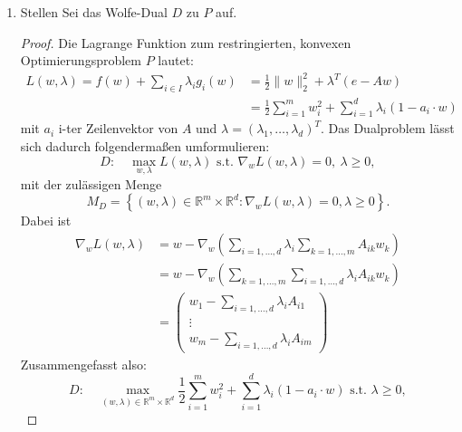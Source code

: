 \documentclass[12pt]{extreport} %
\newcommand{\R}{\mathbb{R}}
\theoremstyle{named}
\theoremstyle{nnamed}
\theoremstyle{itshape}
\theoremstyle{normal}
\begin{document}
\begin{enumerate}
\begin{proof}
			Beim gegebenen Problem ist $g_i(w) = - (A w)_i + 1$ für alle $i \in \{1, \dotsc, d \}$ eine lineare und somit konvexe Funktion. Da $f \in C^2(\R^m)$ mit $f(w) = \frac{1}{2} \sum_{i=1,\dotsc, m} w_i^2$ folgt $\nabla_w f(w) = w$ und 
			$$ D^2 f =  \left(\begin{array}{rrrrr} 1 & 0 & \dotsc & 0 \\ 0 & 1 & 0 & \vdots \\ \vdots & 0 & \ddots & 0\\ 0 &  \dotsc & 0 & 1 \end{array}\right) \succ 0, $$
			womit nach 2.5.10 $f$ insbesondere konvex und $P$ ein konvexes Optimierungsproblem ist.
		\end{proof}
	\item Stellen Sei das Wolfe-Dual $D$ zu $P$ auf.
		\begin{proof}
			Die Lagrange Funktion zum restringierten, konvexen Optimierungsproblem $P$ lautet:
			\begin{align*}
				L(w, \lambda) = f(w) + \sum_{i \in I} \lambda_i g_i(w) & = \frac{1}{2} \| w \|_2^2 + \lambda^T \left( e - Aw \right) \\
					& =\frac{1}{2} \sum_{i=1}^m w_i^2 + \sum_{i=1}^d \lambda_i \left(1 - a_i \cdot w \right)
			\end{align*}
			mit $a_i$ i-ter Zeilenvektor von $A$ und $\lambda = \left( \lambda_1, \dotsc, \lambda_d \right)^T$. Das Dualproblem lässt sich dadurch folgendermaßen umformulieren:
			$$ D: \quad \max_{w,\lambda} L(w, \lambda) \text{ s.t. } \nabla_w L(w, \lambda) = 0, ~\lambda \geq 0, $$
			mit der zulässigen Menge
			$$ M_D = \left\{ (w, \lambda) \in \R^m \times \R^d \colon \nabla_w L(w, \lambda) = 0, \lambda \geq 0 \right\}. $$
			Dabei ist 
			\begin{align*}
			 \nabla_w L(w, \lambda) & = w - \nabla_w \left( \sum_{i=1,\dotsc,d} \lambda_i \sum_{k=1, \dotsc, m} A_{ik}w_{k} \right) \\
			& = w - \nabla_w \left( \sum_{k=1, \dotsc, m}  \sum_{i=1,\dotsc,d}  \lambda_i A_{ik}w_{k} \right) \\
			& = \left(\begin{array}{c} w_1 -\sum_{i=1,\dotsc,d}  \lambda_i A_{i1}  \\ \vdots \\ w_m -\sum_{i=1,\dotsc,d}  \lambda_i A_{im} \end{array}\right) 
			\end{align*}
			Zusammengefasst also:
			$$ D: \quad \max_{(w, \lambda) \in \R^m \times \R^d} \frac{1}{2} \sum_{i=1}^m w_i^2 + \sum_{i=1}^d \lambda_i \left(1 - a_i \cdot w \right) \text{ s.t. } \lambda \geq 0, $$

\end{proof}
\end{enumerate}
\end{document}
